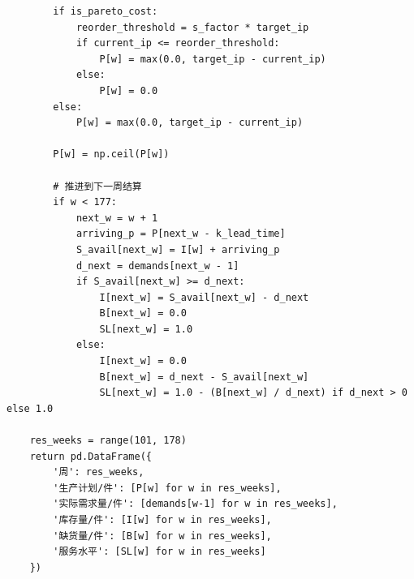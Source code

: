 \begin{verbatim}
        if is_pareto_cost:
            reorder_threshold = s_factor * target_ip
            if current_ip <= reorder_threshold:
                P[w] = max(0.0, target_ip - current_ip)
            else:
                P[w] = 0.0
        else:
            P[w] = max(0.0, target_ip - current_ip)
            
        P[w] = np.ceil(P[w])
        
        # 推进到下一周结算
        if w < 177:
            next_w = w + 1
            arriving_p = P[next_w - k_lead_time]
            S_avail[next_w] = I[w] + arriving_p
            d_next = demands[next_w - 1]
            if S_avail[next_w] >= d_next:
                I[next_w] = S_avail[next_w] - d_next
                B[next_w] = 0.0
                SL[next_w] = 1.0
            else:
                I[next_w] = 0.0
                B[next_w] = d_next - S_avail[next_w]
                SL[next_w] = 1.0 - (B[next_w] / d_next) if d_next > 0 else 1.0
                
    res_weeks = range(101, 178)
    return pd.DataFrame({
        '周': res_weeks,
        '生产计划/件': [P[w] for w in res_weeks],
        '实际需求量/件': [demands[w-1] for w in res_weeks],
        '库存量/件': [I[w] for w in res_weeks],
        '缺货量/件': [B[w] for w in res_weeks],
        '服务水平': [SL[w] for w in res_weeks]
    })
\end{verbatim}
